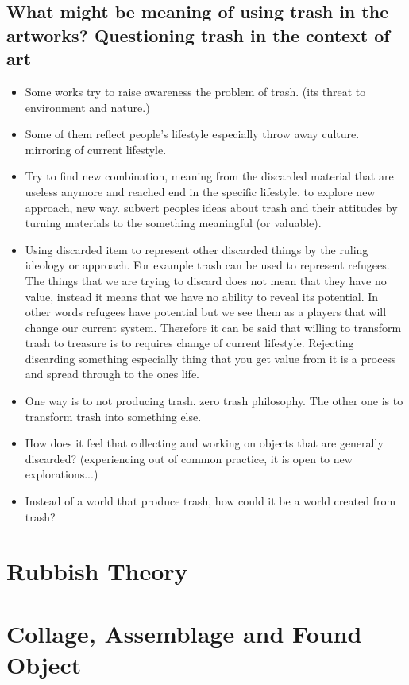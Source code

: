 \documentclass{article}
\begin{document}
\subsection{What might be meaning of using trash in the artworks? Questioning trash in the context of art}
\begin{itemize}
\item Some works try to raise awareness the problem of trash. (its threat to environment and nature.)
\item Some of them reflect people's lifestyle especially throw away culture. mirroring of current lifestyle.
\item Try to find new combination, meaning from the discarded material that are useless anymore and reached end in the specific lifestyle. to explore new approach, new way. subvert peoples ideas about trash and their attitudes by turning materials to the something meaningful (or valuable).
\item Using discarded item to represent other discarded things by the ruling ideology or approach. For example trash can be used to represent refugees. The things that we are trying to discard does not mean that they have no value, instead it means that we have no ability to reveal its potential. In other words refugees have potential but we see them as a players that will change our current system. Therefore it can be said that willing to transform trash to treasure is to requires change of current lifestyle. Rejecting discarding something especially thing that you get value from it is a process and spread through to the ones life.
\item One way is to not producing trash. zero trash philosophy. The other one is to transform trash into something else.
\item How does it feel that collecting and working on objects that are generally discarded? (experiencing out of common practice, it is open to new explorations...)
\item Instead of a world that produce trash, how could it be a world created from trash?
\end{itemize}

\section{Rubbish Theory}

\section{Collage, Assemblage and Found Object}



\end{document}
